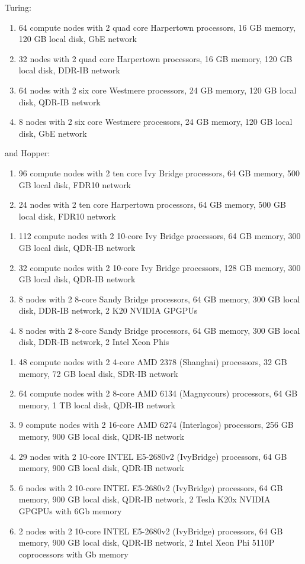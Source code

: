 \ifantwerpen
Turing:
  \begin{enumerate}
    \item  64 compute nodes with 2 quad core Harpertown processors, 16 GB memory,
           120 GB local disk, GbE network
    \item  32 nodes with 2 quad core Harpertown processors, 16 GB memory,
           120 GB local disk, DDR-IB network
    \item  64 nodes with 2 six core Westmere processors, 24 GB memory,
           120 GB local disk, QDR-IB network
    \item  8 nodes with 2 six core Westmere processors, 24 GB memory,
           120 GB local disk, GbE network
  \end{enumerate}
and Hopper:
  \begin{enumerate}
    \item  96 compute nodes with 2 ten core Ivy Bridge processors, 64 GB memory,
           500 GB local disk, FDR10 network
    \item  24 nodes with 2 ten core Harpertown processors, 64 GB memory,
           500 GB local disk, FDR10 network
  \end{enumerate}
\fi
\ifleuven
  \begin{enumerate}
    \item  112 compute nodes with 2 10-core Ivy Bridge processors, 64 GB memory,
           300 GB local disk, QDR-IB network
    \item  32 compute nodes with 2 10-core Ivy Bridge processors, 128 GB memory,
           300 GB local disk, QDR-IB network
    \item  8 nodes with 2 8-core Sandy Bridge processors, 64 GB memory,
           300 GB local disk, DDR-IB network, 2 K20 NVIDIA GPGPUs
    \item  8 nodes with 2 8-core Sandy Bridge processors, 64 GB memory,
           300 GB local disk, DDR-IB network, 2 Intel Xeon Phis
  \end{enumerate}
\fi
\ifbrussel
  \begin{enumerate}
    \item  48 compute nodes with 2 4-core AMD 2378 (Shanghai) processors, 32 GB memory,
           72 GB local disk, SDR-IB network
    \item  64 compute nodes with 2 8-core AMD 6134 (Magnycours) processors, 64 GB memory,
           1 TB local disk, QDR-IB network
    \item  9 compute nodes with 2 16-core AMD 6274 (Interlagos) processors, 256 GB memory,
           900 GB local disk, QDR-IB network
    \item  29 nodes with 2 10-core INTEL E5-2680v2 (IvyBridge) processors, 64 GB memory,
           900 GB local disk, QDR-IB network
    \item  6 nodes with 2 10-core INTEL E5-2680v2 (IvyBridge) processors, 64 GB memory,
           900 GB local disk, QDR-IB network, 2 Tesla K20x NVIDIA GPGPUs with 6Gb memory 
    \item  2 nodes with 2 10-core INTEL E5-2680v2 (IvyBridge) processors, 64 GB memory,
           900 GB local disk, QDR-IB network, 2 Intel Xeon Phi 5110P coprocessors with Gb memory
  \end{enumerate}
\fi

